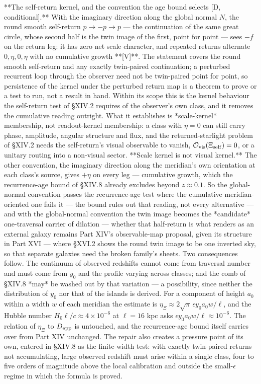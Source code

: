 **The self-return kernel, and the convention the age bound selects [D, conditional].** With the imaginary direction along the global normal $N$, the round smooth self-return $p\to-p\to p$ — the continuation of the same great circle, whose second half is the twin image of the first, point for point — sees $-f$ on the return leg: it has zero net scale character, and repeated returns alternate $0,\eta,0,\eta$ with no cumulative growth **[V]**. The statement covers the round smooth self-return and any exactly twin-paired continuation; a perturbed recurrent loop through the observer need not be twin-paired point for point, so persistence of the kernel under the perturbed return map is a theorem to prove or a test to run, not a result in hand. Within its scope this is the kernel behaviour the self-return test of §XIV.2 requires of the observer's own class, and it removes the cumulative reading outright. What it establishes is *scale-kernel* membership, not readout-kernel membership: a class with $\eta = 0$ can still carry phase, amplitude, angular structure and flux, and the returned-starlight problem of §XIV.2 needs the self-return's visual observable to vanish, $\mathcal O_{\rm vis}(\Xi_{\rm self}) = 0$, or a unitary routing into a non-visual sector. **Scale kernel is not visual kernel.** The other convention, the imaginary direction along the meridian's own orientation at each class's source, gives $+\eta$ on every leg — cumulative growth, which the recurrence-age bound of §XIV.8 already excludes beyond $z\approx0.1$. So the global-normal convention passes the recurrence-age test where the cumulative meridian-oriented one fails it — the bound rules out that reading, not every alternative — and with the global-normal convention the twin image becomes the *candidate* one-traversal carrier of dilation — whether that half-return is what renders as an external galaxy remains Part XIV's observable-map proposal, given its structure in Part XVI — where §XVI.2 shows the round twin image to be one inverted sky, so that separate galaxies need the broken family's sheets. Two consequences follow. The continuum of observed redshifts cannot come from traversal number and must come from $y_0$ and the profile varying across classes; and the comb of §XIV.8 *may* be washed out by that variation — a possibility, since neither the distribution of $y_0$ nor that of the islands is derived. For a component of height $a_0$ within a width $w$ of each meridian the estimate is $\eta_\Xi\approx2\sqrt\pi\,\epsilon y_0a_0w/\ell$, and the Hubble number $H_0\ell/c\approx4\times10^{-6}$ at $\ell = 16$ kpc asks $\epsilon y_0a_0w/\ell\approx10^{-6}$. The relation of $\eta_\Xi$ to $D_{\rm app}$ is untouched, and the recurrence-age bound itself carries over from Part XIV unchanged. The repair also creates a pressure point of its own, entered in §XIV.8 as the finite-width test: with exactly twin-paired returns not accumulating, large observed redshift must arise within a single class, four to five orders of magnitude above the local calibration and outside the small-$\epsilon$ regime in which the formula is proved.

